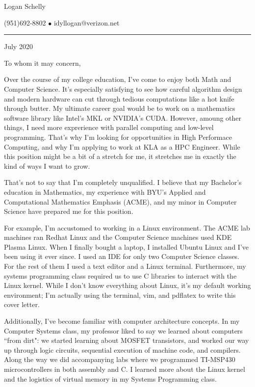 \documentclass{article}
\begin{document}
\begin{center}
{\Large Logan Schelly}

(951)\phantom{-}692-8802
$\bullet$
idyllogan@verizon.net
\end{center}

\hrule
\bigskip
{} July 2020
\bigskip

To whom it may concern,
\bigskip

Over the course of my college education, I've come to enjoy both Math and Computer Science.
It's especially satisfying to see how careful algorithm design and modern hardware can cut through tedious computations like a hot knife through butter.
My ultimate career goal would be to work on a mathematics software library like Intel's MKL or NVIDIA's CUDA.
However, amoung other things, I need more exprerience with parallel computing and low-level programming.
That's why I'm looking for opportunities in High Performace Computing, and why I'm applying to work 
at KLA as a HPC Engineer.
While this position might be a bit of a stretch for me, it stretches me in exactly the kind of ways I want to grow.

That's not to say that I'm completely unqualified.
I believe that my Bachelor's education in Mathematics,
my experience with BYU's Applied and Computational Mathematics Emphasis (ACME),
and my minor in Computer Science have prepared me for this position.

For example, I'm accustomed to working in a Linux environment.
The ACME lab machines ran Redhat Linux and the Computer Science machines used KDE Plasma Linux.
When I finally bought a laptop, I installed Ubuntu Linux and I've been using it ever since.
I used an IDE for only two Computer Science classes.
For the rest of them I used a text editor and a Linux terminal.
Furthermore, my systems programming class required us to use C libraries to interact with the Linux kernel.
While I don't know everything about Linux, it's my default working environment;
I'm actually using the terminal, vim, and pdflatex to write this cover letter.

Additionally, I've become familiar with computer architecture concepts.
In my Computer Systems class, my professor liked to say we learned about computers ``from dirt":
we started learning about MOSFET transistors, and worked our way up through logic circuits,
sequential execution of machine code, and compilers.
Along the way we did accompanying labs where we programmed TI-MSP430 microcontrollers in both assembly and C.
I learned more about the Linux kernel and the logistics of virtual memory in my Systems Programming class.
\end{document}
